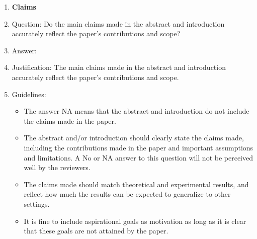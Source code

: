\documentclass{article}
\theoremstyle{plain}
\theoremstyle{definition}
\theoremstyle{remark}
\begin{document}
\begin{enumerate}

\item {\bf Claims}
    \item[] Question: Do the main claims made in the abstract and introduction accurately reflect the paper's contributions and scope?
    \item[] Answer: \answerYes{} %
    \item[] Justification: The main claims made in the abstract and introduction accurately reflect the
paper’s contributions and scope.
    \item[] Guidelines:
    \begin{itemize}
        \item The answer NA means that the abstract and introduction do not include the claims made in the paper.
        \item The abstract and/or introduction should clearly state the claims made, including the contributions made in the paper and important assumptions and limitations. A No or NA answer to this question will not be perceived well by the reviewers. 
        \item The claims made should match theoretical and experimental results, and reflect how much the results can be expected to generalize to other settings. 
        \item It is fine to include aspirational goals as motivation as long as it is clear that these goals are not attained by the paper. 
    \end{itemize}


\end{enumerate}
\end{document}
